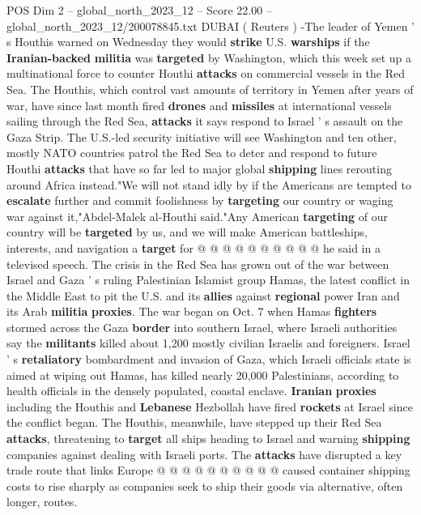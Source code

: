 \begin{textsample}{POS Dim 2 – global\_north\_2023\_12 – Score 22.00 – global\_north\_2023\_12/200078845.txt}  \label{ex:f2_pos_238}
DUBAI ( Reuters ) -The leader of Yemen ' s Houthis warned on Wednesday they would \textbf{strike} U.S. \textbf{warships} if the \textbf{Iranian-backed} \textbf{militia} was \textbf{targeted} by Washington, which this week set up a multinational force to counter Houthi \textbf{attacks} on commercial vessels in the Red Sea.
The Houthis, which control vast amounts of territory in Yemen after years of war, have since last month fired \textbf{drones} and \textbf{missiles} at international vessels sailing through the Red Sea, \textbf{attacks} it says respond to Israel ' s assault on the Gaza Strip.
The U.S.-led security initiative will see Washington and ten other, mostly NATO countries patrol the Red Sea to deter and respond to future Houthi \textbf{attacks} that have so far led to major global \textbf{shipping} lines rerouting around Africa instead."We will not stand idly by if the Americans are tempted to \textbf{escalate} further and commit foolishness by \textbf{targeting} our country or waging war against it,"Abdel-Malek al-Houthi said."Any American \textbf{targeting} of our country will be \textbf{targeted} by us, and we will make American battleships, interests, and navigation a \textbf{target} for @ @ @ @ @ @ @ @ @ @ he said in a televised speech.
The crisis in the Red Sea has grown out of the war between Israel and Gaza ' s ruling Palestinian Islamist group Hamas, the latest conflict in the Middle East to pit the U.S. and its \textbf{allies} against \textbf{regional} power Iran and its Arab \textbf{militia} \textbf{proxies}.
The war began on Oct. 7 when Hamas \textbf{fighters} stormed across the Gaza \textbf{border} into southern Israel, where Israeli authorities say the \textbf{militants} killed about 1,200 mostly civilian Israelis and foreigners.
Israel ' s \textbf{retaliatory} bombardment and invasion of Gaza, which Israeli officials state is aimed at wiping out Hamas, has killed nearly 20,000 Palestinians, according to health officials in the densely populated, coastal enclave. \textbf{Iranian} \textbf{proxies} including the Houthis and \textbf{Lebanese} Hezbollah have fired \textbf{rockets} at Israel since the conflict began.
The Houthis, meanwhile, have stepped up their Red Sea \textbf{attacks}, threatening to \textbf{target} all ships heading to Israel and warning \textbf{shipping} companies against dealing with Israeli ports.
The \textbf{attacks} have disrupted a key trade route that links Europe @ @ @ @ @ @ @ @ @ @ caused container shipping costs to rise sharply as companies seek to ship their goods via alternative, often longer, routes.

\end{textsample}
